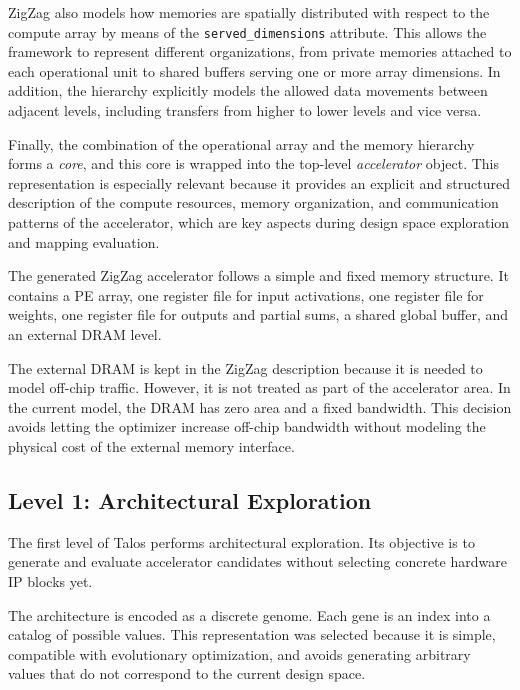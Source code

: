 ZigZag also models how memories are spatially distributed with
respect to the compute array by means of the
\texttt{served\_dimensions} attribute. This allows the framework to
represent different organizations, from private memories attached to
each operational unit to shared buffers serving one or more array
dimensions. In addition, the hierarchy explicitly models the allowed
data movements between adjacent levels, including transfers from
higher to lower levels and vice versa.

Finally, the combination of the operational array and the memory
hierarchy forms a \textit{core}, and this core is wrapped into the
top-level \textit{accelerator} object. This representation is
especially relevant because it provides an explicit and structured
description of the compute resources, memory organization, and
communication patterns of the accelerator, which are key aspects
during design space exploration and mapping evaluation.

The generated ZigZag accelerator follows a simple and fixed memory
structure. It contains a PE array, one register file for input
activations, one register file for weights, one register file for
outputs and partial sums, a shared global buffer, and an external
DRAM level.

The external DRAM is kept in the ZigZag description because it is
needed to model off-chip traffic. However, it is not treated as part
of the accelerator area. In the current model, the DRAM has zero area
and a fixed bandwidth. This decision avoids letting the optimizer
increase off-chip bandwidth without modeling the physical cost of
the external memory interface.

\subsection{Level 1: Architectural Exploration}
\label{subsec:genome}
The first level of Talos performs architectural exploration. Its
objective is to generate and evaluate accelerator candidates without
selecting concrete hardware IP blocks yet.

The architecture is encoded as a discrete genome. Each gene is an
index into a catalog of possible values. This representation was
selected because it is simple, compatible with evolutionary
optimization, and avoids generating arbitrary values that do not
correspond to the current design space.

